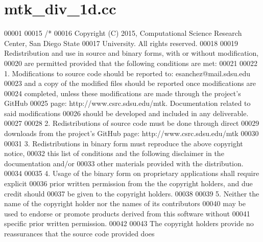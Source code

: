 \hypertarget{mtk__div__1d_8cc_source}{\section{mtk\+\_\+div\+\_\+1d.\+cc}
\label{mtk__div__1d_8cc_source}
}

\begin{DoxyCode}
00001 
00015 \textcolor{comment}{/*}
00016 \textcolor{comment}{Copyright (C) 2015, Computational Science Research Center, San Diego State}
00017 \textcolor{comment}{University. All rights reserved.}
00018 \textcolor{comment}{}
00019 \textcolor{comment}{Redistribution and use in source and binary forms, with or without modification,}
00020 \textcolor{comment}{are permitted provided that the following conditions are met:}
00021 \textcolor{comment}{}
00022 \textcolor{comment}{1. Modifications to source code should be reported to: esanchez@mail.sdsu.edu}
00023 \textcolor{comment}{and a copy of the modified files should be reported once modifications are}
00024 \textcolor{comment}{completed, unless these modifications are made through the project's GitHub}
00025 \textcolor{comment}{page: http://www.csrc.sdsu.edu/mtk. Documentation related to said modifications}
00026 \textcolor{comment}{should be developed and included in any deliverable.}
00027 \textcolor{comment}{}
00028 \textcolor{comment}{2. Redistributions of source code must be done through direct}
00029 \textcolor{comment}{downloads from the project's GitHub page: http://www.csrc.sdsu.edu/mtk}
00030 \textcolor{comment}{}
00031 \textcolor{comment}{3. Redistributions in binary form must reproduce the above copyright notice,}
00032 \textcolor{comment}{this list of conditions and the following disclaimer in the documentation and/or}
00033 \textcolor{comment}{other materials provided with the distribution.}
00034 \textcolor{comment}{}
00035 \textcolor{comment}{4. Usage of the binary form on proprietary applications shall require explicit}
00036 \textcolor{comment}{prior written permission from the the copyright holders, and due credit should}
00037 \textcolor{comment}{be given to the copyright holders.}
00038 \textcolor{comment}{}
00039 \textcolor{comment}{5. Neither the name of the copyright holder nor the names of its contributors}
00040 \textcolor{comment}{may be used to endorse or promote products derived from this software without}
00041 \textcolor{comment}{specific prior written permission.}
00042 \textcolor{comment}{}
00043 \textcolor{comment}{The copyright holders provide no reassurances that the source code provided does}

\end{DoxyCode}
